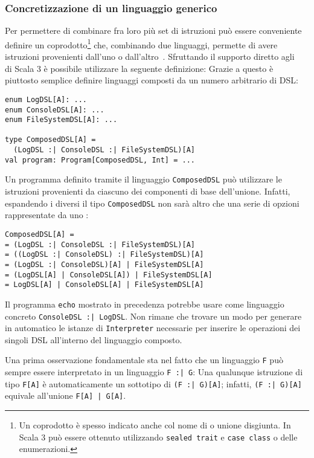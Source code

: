 \subsubsection{Concretizzazione di un linguaggio generico}
Per permettere di combinare fra loro più set di istruzioni può essere conveniente definire un coprodotto\footnote{Un coprodotto è spesso indicato anche col nome di  o unione disgiunta. In Scala 3 può essere ottenuto utilizzando \lstinline{sealed trait} e \lstinline{case class} o delle enumerazioni.} che, combinando due linguaggi, permette di avere istruzioni provenienti dall'uno o dall'altro~\cite{cit:data-types-a-la-carte}.
Sfruttando il supporto diretto agli ~\cite{cit:scala3-union-types} di Scala 3 è possibile utilizzare la seguente definizione:
Grazie a questo  è piuttosto semplice definire linguaggi composti da un numero arbitrario di DSL:
\begin{lstlisting}[language=scala3]
enum LogDSL[A]: ... 
enum ConsoleDSL[A]: ...
enum FileSystemDSL[A]: ...

type ComposedDSL[A] =
  (LogDSL :| ConsoleDSL :| FileSystemDSL)[A]
val program: Program[ComposedDSL, Int] = ...
\end{lstlisting}
Un programma definito tramite il linguaggio \lstinline{ComposedDSL} può utilizzare le istruzioni provenienti da ciascuno dei componenti di base dell'unione. Infatti, espandendo i diversi  il tipo \lstinline{ComposedDSL} non sarà altro che una serie di opzioni rappresentate da uno :
\begin{lstlisting}
ComposedDSL[A] =
= (LogDSL :| ConsoleDSL :| FileSystemDSL)[A]
= ((LogDSL :| ConsoleDSL) :| FileSystemDSL)[A]
= (LogDSL :| ConsoleDSL)[A] | FileSystemDSL[A]
= (LogDSL[A] | ConsoleDSL[A]) | FileSystemDSL[A]
= LogDSL[A] | ConsoleDSL[A] | FileSystemDSL[A]
\end{lstlisting}

Il programma \lstinline{echo} mostrato in precedenza potrebbe usare come linguaggio concreto \lstinline{ConsoleDSL :| LogDSL}. Non rimane che trovare un modo per generare in automatico le istanze di \lstinline{Interpreter} necessarie per inserire le operazioni dei singoli DSL all'interno del linguaggio composto.

Una prima osservazione fondamentale sta nel fatto che un linguaggio \lstinline{F} può sempre essere interpretato in un linguaggio \lstinline{F :| G}:
Una qualunque istruzione di tipo \lstinline{F[A]} è automaticamente un sottotipo di \lstinline{(F :| G)[A]}; infatti, \lstinline{(F :| G)[A]} equivale all'unione \lstinline{F[A] | G[A]}.

